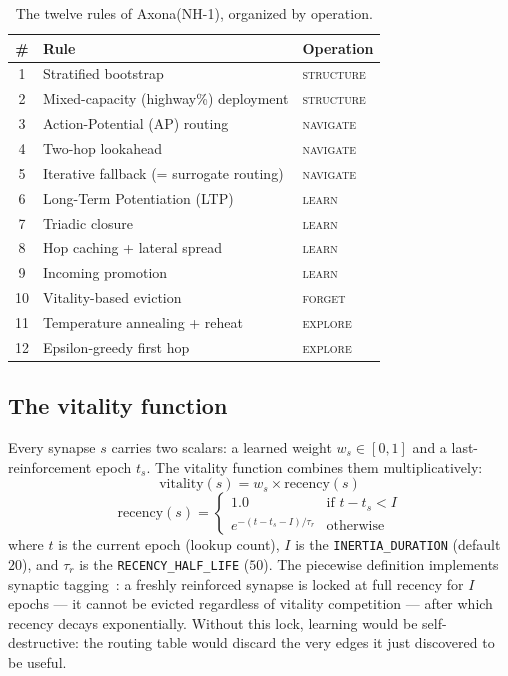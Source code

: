 \documentclass[conference]{IEEEtran}
\newcommand{\axona}{Axona\xspace}
\newcommand{\nhone}{NH-1\xspace}
\begin{document}
\begin{table}[t]
\centering
\caption{The twelve rules of \axona (\nhone), organized by operation.}
\label{tab:rules}
\small
\begin{tabular}{@{}cp{}p{}@{}}
\toprule
\textbf{\#} & \textbf{Rule} & \textbf{Operation} \\
\midrule
1 & Stratified bootstrap & \textsc{structure} \\
2 & Mixed-capacity (highway\%) deployment & \textsc{structure} \\
3 & Action-Potential (AP) routing & \textsc{navigate} \\
4 & Two-hop lookahead & \textsc{navigate} \\
5 & Iterative fallback (= surrogate routing) & \textsc{navigate} \\
6 & Long-Term Potentiation (LTP) & \textsc{learn} \\
7 & Triadic closure & \textsc{learn} \\
8 & Hop caching + lateral spread & \textsc{learn} \\
9 & Incoming promotion & \textsc{learn} \\
10 & Vitality-based eviction & \textsc{forget} \\
11 & Temperature annealing + reheat & \textsc{explore} \\
12 & Epsilon-greedy first hop & \textsc{explore} \\
\bottomrule
\end{tabular}
\end{table}

\subsection{The vitality function}
\label{sec:nh1-vitality}

Every synapse $s$ carries two scalars: a learned weight $w_s \in [0,1]$ and a
last-reinforcement epoch $t_s$. The vitality function combines them
multiplicatively:
\begin{equation}
\mathrm{vitality}(s) = w_s \times \mathrm{recency}(s)
\label{eq:vitality}
\end{equation}
\begin{equation}
\mathrm{recency}(s) =
\begin{cases}
1.0 & \text{if } t - t_s < I \\
e^{-(t - t_s - I)/\tau_r} & \text{otherwise}
\end{cases}
\label{eq:recency}
\end{equation}
where $t$ is the current epoch (lookup count), $I$ is the
\texttt{INERTIA\_DURATION} (default $20$), and $\tau_r$ is the
\texttt{RECENCY\_HALF\_LIFE} ($50$). The piecewise definition implements
synaptic tagging~\cite{frey1997synaptic}: a freshly reinforced synapse is
locked at full recency for $I$ epochs --- it cannot be evicted regardless of
vitality competition --- after which recency decays exponentially. Without
this lock, learning would be self-destructive: the routing table would
discard the very edges it just discovered to be useful.
\end{document}
